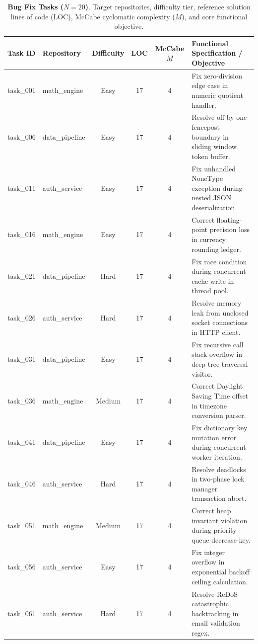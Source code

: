 
\begin{table}[t]
\centering
\scriptsize
\caption{\textbf{Bug Fix Tasks ($N=20$)}. Target repositories, difficulty tier, reference solution lines of code (LOC), McCabe cyclomatic complexity ($M$), and core functional objective.}
\label{tab:tasks_bug_fix}
\begin{tabular}{llcccl}
\toprule
\textbf{Task ID} & \textbf{Repository} & \textbf{Difficulty} & \textbf{LOC} & \textbf{McCabe $M$} & \textbf{Functional Specification / Objective} \\
\midrule
task\_001 & math\_engine & Easy & 17 & 4 & Fix zero-division edge case in numeric quotient handler. \\
task\_006 & data\_pipeline & Easy & 17 & 4 & Resolve off-by-one fencepost boundary in sliding window token buffer. \\
task\_011 & auth\_service & Easy & 17 & 4 & Fix unhandled NoneType exception during nested JSON deserialization. \\
task\_016 & math\_engine & Easy & 17 & 4 & Correct floating-point precision loss in currency rounding ledger. \\
task\_021 & data\_pipeline & Hard & 17 & 4 & Fix race condition during concurrent cache write in thread pool. \\
task\_026 & auth\_service & Hard & 17 & 4 & Resolve memory leak from unclosed socket connections in HTTP client. \\
task\_031 & data\_pipeline & Easy & 17 & 4 & Fix recursive call stack overflow in deep tree traversal visitor. \\
task\_036 & math\_engine & Medium & 17 & 4 & Correct Daylight Saving Time offset in timezone conversion parser. \\
task\_041 & data\_pipeline & Easy & 17 & 4 & Fix dictionary key mutation error during concurrent worker iteration. \\
task\_046 & auth\_service & Hard & 17 & 4 & Resolve deadlocks in two-phase lock manager transaction abort. \\
task\_051 & math\_engine & Medium & 17 & 4 & Correct heap invariant violation during priority queue decrease-key. \\
task\_056 & auth\_service & Easy & 17 & 4 & Fix integer overflow in exponential backoff ceiling calculation. \\
task\_061 & auth\_service & Hard & 17 & 4 & Resolve ReDoS catastrophic backtracking in email validation regex. \\

\end{tabular}
\end{table}
